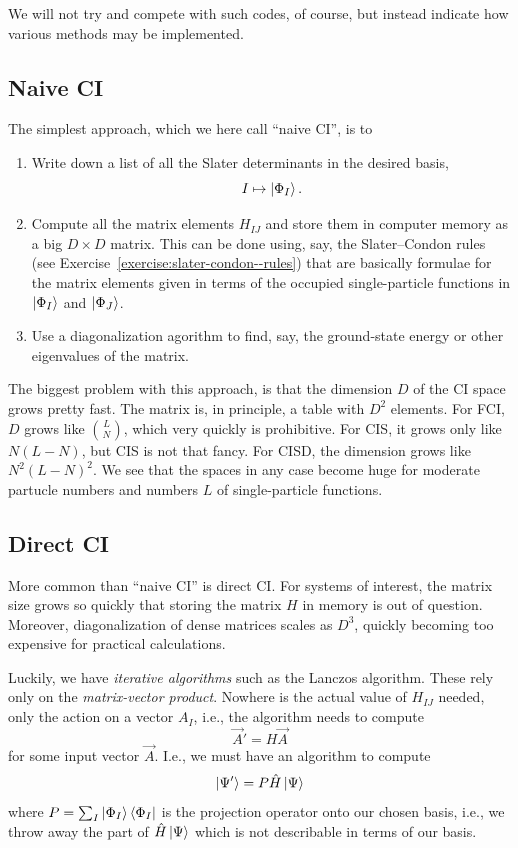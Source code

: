 \documentclass{report}
\theoremstyle{plain}
\theoremstyle{definition}
\begin{document}
We will not try and compete with such codes, of course, but instead
indicate how various methods may be implemented.

\subsection{Naive CI}

The simplest approach, which we here call ``naive CI'', is to
\begin{enumerate}
\item
  Write down a list of all the Slater determinants in the desired
  basis,
  \[ I \mapsto \ket{\Phi_I}. \]
\item
  Compute all the matrix elements $H_{IJ}$ and store them in computer
  memory as a big $D\times D$ matrix. This can be done using, say, the
  Slater--Condon rules (see
  Exercise~\ref{exercise:slater-condon--rules}) that are basically
  formulae for the matrix elements given in terms of the occupied
  single-particle functions in $\ket{\Phi_I}$ and $\ket{\Phi_J}$.
\item
  Use a diagonalization agorithm to find, say, the ground-state energy
  or other eigenvalues of the matrix.
\end{enumerate}

The biggest problem with this approach, is that the dimension $D$ of
the CI space grows pretty fast. The matrix is, in principle, a table
with $D^2$ elements. For FCI, $D$ grows like $\binom{L}{N}$, which
very quickly is prohibitive. For CIS, it grows only like $N(L-N)$, but
CIS is not that fancy. For CISD, the dimension grows like $N^2
(L-N)^2$. We see that the spaces in any case become huge for moderate
partucle numbers and numbers $L$ of single-particle functions.

\subsection{Direct CI}

More common than ``naive CI'' is direct CI. For systems of interest,
the matrix size grows so quickly that storing the matrix $H$ in memory
is out of question. Moreover, diagonalization of dense matrices scales
as $D^3$, quickly becoming too expensive for practical calculations.

Luckily, we have \emph{iterative algorithms} such as the Lanczos
algorithm. These rely only on the \emph{matrix-vector product}. Nowhere
is the actual value of $H_{IJ}$ needed, only the action on a vector
$A_I$, i.e., the algorithm needs to compute
\begin{equation}
  \vec{A}'  = H\vec{A}
\end{equation}
for some input vector $\vec{A}$. I.e., we must have an algorithm to
compute 
\begin{equation}
  \ket{\Psi'} = P \hat{H}\ket{\Psi}
\end{equation}
where $P = \sum_I \ket{\Phi_I}\bra{\Phi_I}$ is the projection operator
onto our chosen basis, i.e., we throw away the part of
$\hat{H}\ket{\Psi}$ which is not describable in terms of our basis.
\end{document}
